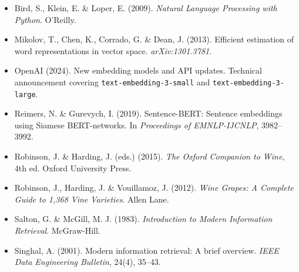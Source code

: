 \documentclass[11pt]{article}
\begin{document}
\begin{itemize}[leftmargin=2em,itemsep=0.2em]
\item Bird, S., Klein, E. \& Loper, E. (2009). \emph{Natural Language Processing with Python}. O'Reilly.
\item Mikolov, T., Chen, K., Corrado, G. \& Dean, J. (2013). Efficient estimation of word representations in vector space. \emph{arXiv:1301.3781}.
\item OpenAI (2024). New embedding models and API updates. Technical announcement covering \texttt{text-embedding-3-small} and \texttt{text-embedding-3-large}.
\item Reimers, N. \& Gurevych, I. (2019). Sentence-BERT: Sentence embeddings using Siamese BERT-networks. In \emph{Proceedings of EMNLP-IJCNLP}, 3982--3992.
\item Robinson, J. \& Harding, J. (eds.) (2015). \emph{The Oxford Companion to Wine}, 4th ed. Oxford University Press.
\item Robinson, J., Harding, J. \& Vouillamoz, J. (2012). \emph{Wine Grapes: A Complete Guide to 1,368 Vine Varieties}. Allen Lane.
\item Salton, G. \& McGill, M. J. (1983). \emph{Introduction to Modern Information Retrieval}. McGraw-Hill.
\item Singhal, A. (2001). Modern information retrieval: A brief overview. \emph{IEEE Data Engineering Bulletin}, 24(4), 35--43.
\end{itemize}
\end{document}
